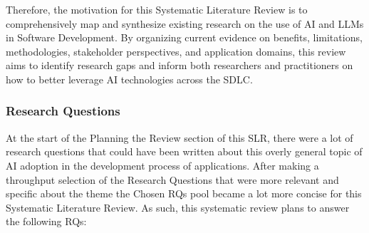 Therefore, the motivation for this Systematic Literature Review is to comprehensively map and synthesize existing research on the use of AI and LLMs in Software Development. By organizing current evidence on benefits, limitations, methodologies, stakeholder perspectives, and application domains, this review aims to identify research gaps and inform both researchers and practitioners on how to better leverage AI technologies across the SDLC.

\subsubsection{Research Questions}
At the start of the Planning the Review section of this SLR, there were a lot of research questions that could have been written about this overly general topic of AI adoption in the development process of applications. After making a throughput selection of the Research Questions that were more relevant and specific about the theme the Chosen RQs pool became a lot more concise for this Systematic Literature Review. As such, this systematic review plans to answer the following RQs:

